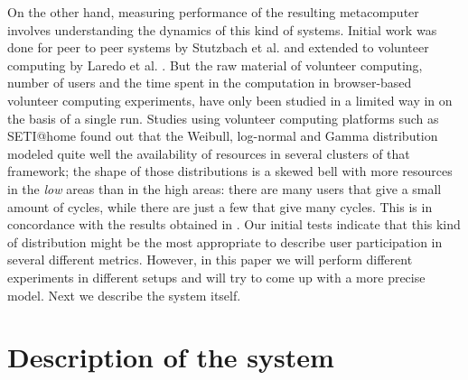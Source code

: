 \documentclass[journal,onecolumn]{IEEEtran}
\begin{document}




On the other hand, measuring performance of the resulting metacomputer
involves understanding the dynamics of this kind of systems. Initial
work was done for peer to peer systems by Stutzbach et
al. \cite{stutzbach2006understanding} and extended to volunteer
computing by Laredo et al. \cite{churn08,laredo2008rcp}. But the raw material of
volunteer computing, number of users and the time spent in the
computation in browser-based volunteer computing experiments, have only been studied in a limited way in
\cite{DBLP:journals/gpem/LaredoBGVAGF14} on the basis of a single
run. Studies using volunteer computing platforms such as SETI@home
\cite{javadi2009mining} found out that the Weibull, log-normal and Gamma distribution
modeled quite well the availability of resources in several clusters
of that framework; the shape of those distributions is a skewed bell
with more resources in the {\em low} areas than in the high areas:
there are many users that give a small amount of cycles, while there
are just a few that give many cycles. This is in concordance with the
results obtained in \cite{agajaj}. Our initial tests indicate that
this kind of distribution might be the most appropriate to describe
user participation in several different metrics. However, in this
paper we will perform different experiments in different setups and
will try to come up with a more precise model. Next we describe the
system itself. 

\section{Description of the system}
\label{sec:description}
\end{document}

